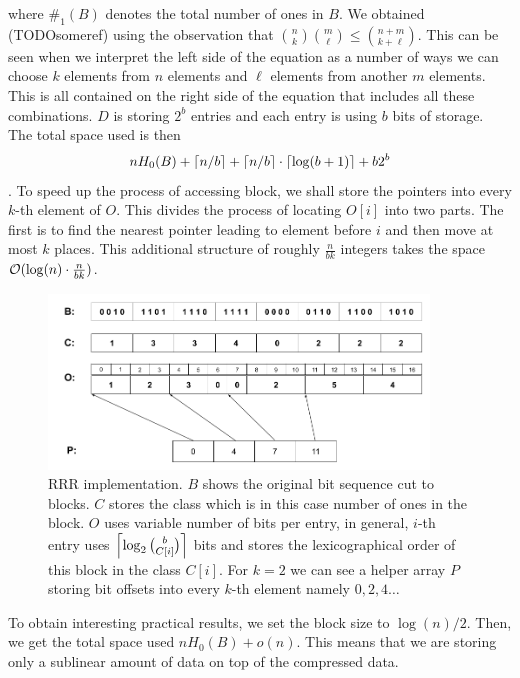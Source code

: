 where $\#_1(B)$ denotes the total number of ones in $B$. We obtained (TODOsomeref) using the
observation that ${n\choose k} {m\choose \ell} \leq {n+m\choose k+\ell}$. This can be seen
when we interpret the left side of the equation as a number of ways we can choose $k$ elements
from $n$ elements and $\ell$ elements from another $m$ elements. This is all contained on the
right side of the equation that includes all these combinations. $D$ is storing $2^b$ entries
and each entry is using $b$ bits of storage.
The total space used is then $$nH_0(B) + \left\lceil n/b \right\rceil + \left\lceil n/b \right\rceil \cdot \left\lceil \log(b+1) \right\rceil + b2^b$$.
To speed up the process of accessing block, we shall store the pointers into every $k$-th element
of $O$. This divides the process of locating $O[i]$ into two parts. The first is to find the nearest
pointer leading to element before $i$ and then move at most $k$ places. This additional structure of
roughly $\frac{n}{bk}$ integers takes the space $\mathcal{O}(\log(n)\cdot \frac{n}{bk})$.

\begin{figure}
	\centerline{
		\includegraphics[width=0.9\textwidth, height=0.3\textheight]{images/rrr}
	}
	\caption[TODO]{RRR implementation. $B$ shows the original bit sequence cut to
    blocks. $C$ stores the class which is in this case number of ones in the block.
    $O$ uses variable number of bits per entry, in general, $i$-th entry uses
    $\left\lceil \log_2{b\choose C[i]} \right\rceil$ bits and stores the lexicographical order
    of this block in the class $C[i]$. For $k=2$ we can see a helper array $P$
    storing bit offsets into every $k$-th element namely $0, 2, 4\ldots$
	}
	\label{obr:RRRFinal}
\end{figure}

To obtain interesting practical results, we set the block size to $\log(n)/2$. Then, we
get the total space used $nH_0(B) + o(n)$. This means that we are storing only a sublinear
amount of data on top of the compressed data.

